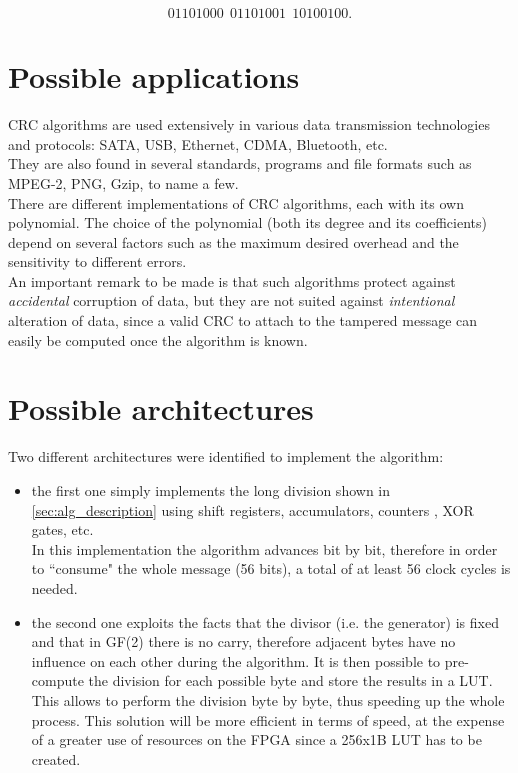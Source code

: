 	\begin{equation}
	01101000\:\:01101001\:\:10100100 .
	\label{eq:example_with_FCS}	
	\end{equation}


\section{Possible applications}\label{sec:possible_applications}
CRC algorithms are used extensively in various data transmission technologies and protocols: SATA, USB, Ethernet, CDMA, Bluetooth, etc.\\
They are also found in several standards, programs and file formats such as MPEG-2, PNG, Gzip, to name a few.\\
There are different implementations of CRC algorithms, each with its own polynomial. The choice of the polynomial (both its degree and its coefficients) depend on several factors such as the maximum desired overhead and the sensitivity to different errors.\\

\noindent An important remark to be made is that such algorithms protect against \textit{accidental} corruption of data, but they are not suited against \textit{intentional} alteration of data, since a valid CRC to attach to the tampered message can easily be computed once the algorithm is known.

\section{Possible architectures}\label{sec:possible_architectures}
Two different architectures were identified to implement the algorithm:
\begin{itemize}
\item the first one simply implements the long division shown in \ref{sec:alg_description} using shift registers, accumulators, counters , XOR gates, etc.\\
In this implementation the algorithm advances bit by bit, therefore in order to ``consume" the whole message (56 bits), a total of at least 56 clock cycles is needed.
\item the second one exploits the facts that the divisor (i.e. the generator) is fixed and that in GF(2) there is no carry, therefore adjacent bytes have no influence on each other during the algorithm. It is then possible to pre-compute the division for each possible byte and store the results in a LUT.\\
This allows to perform the division byte by byte, thus speeding up the whole process. This solution will be more efficient in terms of speed, at the expense of a greater use of resources on the FPGA since a 256x1B LUT has to be created.
\end{itemize}
